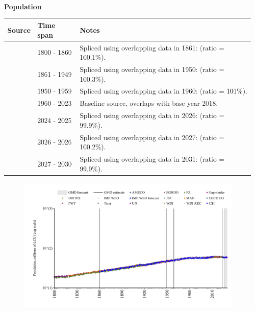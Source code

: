 \documentclass[12pt,a4paper,landscape]{article}
\begin{document}
\begin{adjustbox}{max totalsize={\paperwidth}{\paperheight},center}
\begin{minipage}[t][\textheight][t]{\textwidth}
\vspace*{0.5cm}
{}
\begin{center}
{\Large\bfseries Population}
\end{center}
\vspace{0.5cm}
\begin{table}[H]
\centering
\small
\begin{tabular}{|l|l|l|}
\hline
\textbf{Source} & \textbf{Time span} & \textbf{Notes} \\
\hline
\rowcolor{white}\cite{Gapminder}& 1800 - 1860 &Spliced using overlapping data in 1861: (ratio = 100.1\%). \\
\rowcolor{lightgray}\cite{CS1_ITA}& 1861 - 1949 &Spliced using overlapping data in 1950: (ratio = 100.3\%). \\
\rowcolor{white}\cite{IMF_IFS}& 1950 - 1959 &Spliced using overlapping data in 1960: (ratio = 101\%). \\
\rowcolor{lightgray}\cite{WDI}& 1960 - 2023 &Baseline source, overlaps with base year 2018. \\
\rowcolor{white}\cite{OECD_EO}& 2024 - 2025 &Spliced using overlapping data in 2026: (ratio = 99.9\%). \\
\rowcolor{lightgray}\cite{AMECO}& 2026 - 2026 &Spliced using overlapping data in 2027: (ratio = 100.2\%). \\
\rowcolor{white}\cite{Gapminder}& 2027 - 2030 &Spliced using overlapping data in 2031: (ratio = 99.9\%). \\
\hline
\end{tabular}
\end{table}
\begin{figure}[H]
\centering
\includegraphics[width=\textwidth,height=0.6\textheight,keepaspectratio]{graphs/ITA_pop.pdf}
\end{figure}
\end{minipage}
\end{adjustbox}
\end{document}
